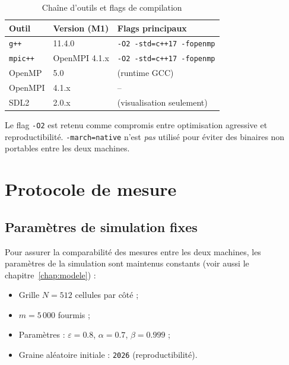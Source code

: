 \begin{table}[h]
\centering
\caption{Chaîne d'outils et flags de compilation}
\label{tab:compile}
\begin{tabular}{lll}
\hline
\textbf{Outil}   & \textbf{Version (M1)} & \textbf{Flags principaux} \\
\hline
\texttt{g++}     & 11.4.0                & \texttt{-O2 -std=c++17 -fopenmp} \\
\texttt{mpic++}  & OpenMPI 4.1.x         & \texttt{-O2 -std=c++17 -fopenmp} \\
OpenMP           & 5.0                   & (runtime GCC) \\
OpenMPI          & 4.1.x                 & -- \\
SDL2             & 2.0.x                 & (visualisation seulement) \\
\hline
\end{tabular}
\end{table}

Le flag \texttt{-O2} est retenu comme compromis entre optimisation agressive et
reproductibilité. \texttt{-march=native} n'est \emph{pas} utilisé pour éviter
des binaires non portables entre les deux machines.

\section{Protocole de mesure}

\subsection{Paramètres de simulation fixes}

Pour assurer la comparabilité des mesures entre les deux machines, les paramètres
de la simulation sont maintenus constants (voir aussi le chapitre~\ref{chap:modele}) :

\begin{itemize}
    \item Grille $N = 512$ cellules par côté ;
    \item $m = 5\,000$ fourmis ;
    \item Paramètres : $\varepsilon = 0.8$, $\alpha = 0.7$, $\beta = 0.999$ ;
    \item Graine aléatoire initiale : \texttt{2026} (reproductibilité).
\end{itemize}

